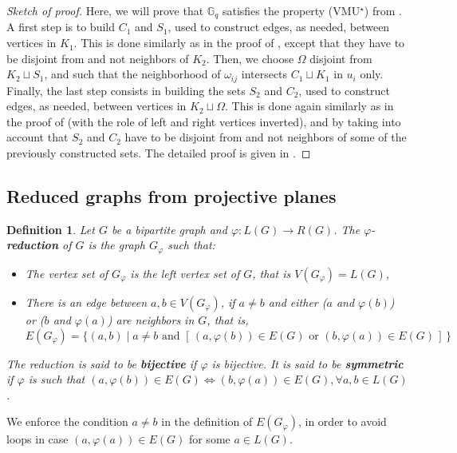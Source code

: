 \documentclass[10pt,a4paper]{article}
\newtheorem{definition}{Definition}[section]
\newcommand{\G}[1][q]{\mathbb{G}_{#1}}
\begin{document}
\begin{proof}[Sketch of proof] Here, we will prove that $\G$ satisfies the property (VMU$^{\star}$) from .
    A first step is to build $C_1$ and $S_1$, used to construct edges, as needed, between vertices in $K_1$. This  is done similarly as in the proof of , except that they have to be disjoint from and not neighbors of $K_2$. Then, we choose $\Omega$ disjoint from $K_2 \sqcup S_1$, and such that the neighborhood of $\omega_{ij}$ intersects $C_1 \sqcup K_1$ in $u_i$ only. Finally, the last step consists in building the sets $S_2$ and $C_2$, used to construct edges, as needed, between vertices in $K_2 \sqcup \Omega$. This is done again similarly as in the proof of  (with the role of left and right vertices inverted), and by taking into account that $S_2$ and $C_2$ have to be disjoint from and not neighbors of some of the previously constructed sets. The detailed proof is given in . 
\end{proof}

\subsection{Reduced graphs from projective planes}
\label{subsec:reduced-graph}
\begin{definition}
    Let $G$ be a bipartite graph and $\varphi: L(G) \rightarrow R(G)$. The $\varphi$-\textbf{reduction} of $G$ is the graph $G_\varphi$ such that:
    \begin{itemize}
        \item The vertex set of $G_\varphi$ is the left vertex set of $G$, that is $V(G_\varphi) = L(G)$,
        \item There is an edge between $a,b\in V(G_\varphi)$, if $a\neq b$ and either ($a$ and $\varphi(b)$) or ($b$ and $\varphi(a)$) are neighbors in $G$, that is,
              $$E(G_\varphi) = \{ (a,b) \mid a \neq b \text{ and } [\,(a,\varphi(b)) \in E(G) \text{ or } (b,\varphi(a)) \in E(G)\,]\, \} $$
    \end{itemize}
    The reduction is said to be \textbf{bijective} if $\varphi$ is bijective. It is said to be \textbf{symmetric} if $\varphi$ is such that $(a,\varphi(b)) \in E(G) \Leftrightarrow (b,\varphi(a)) \in E(G),  \forall a,b \in L(G)$.   
\end{definition}
We enforce the condition $a\neq b$ in the definition of $E(G_\varphi)$, in order to avoid loops in case $(a,\varphi(a)) \in E(G)$ for some $a\in L(G)$.
\end{document}
